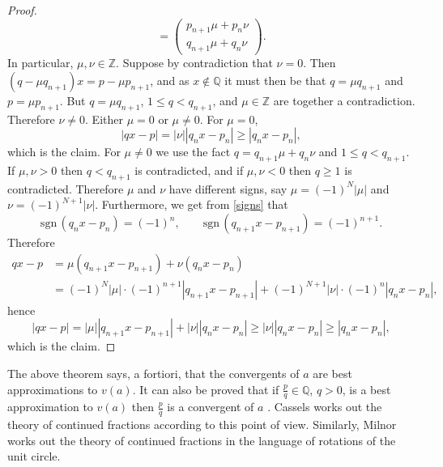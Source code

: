\documentclass{amsart}
\def\sgn{\ensuremath{\mathrm{sgn}}\,}
\begin{document}
\begin{proof}
\[=\begin{pmatrix}p_{n+1} \mu + p_n \nu\\ q_{n+1}\mu+q_n \nu\end{pmatrix}.
\]
In particular, $\mu,\nu \in \mathbb{Z}$.
Suppose by contradiction that $\nu=0$. Then $(q-\mu q_{n+1})x = p-\mu p_{n+1}$, and as $x \not \in \mathbb{Q}$ it must then be that 
$q=\mu q_{n+1}$ and $p=\mu p_{n+1}$. But $q=\mu q_{n+1}$, $1 \leq q < q_{n+1}$, and $\mu \in \mathbb{Z}$ are together a contradiction. Therefore
$\nu \neq 0$. 
Either $\mu=0$ or $\mu \neq 0$. For $\mu =0$,
\[
|qx-p| = |\nu| |q_nx-p_n| \geq |q_nx-p_n|,
\]
which is the claim. For $\mu \neq 0$ we use the fact
$q = q_{n+1} \mu + q_n \nu$ and $1 \leq q < q_{n+1}$. If $\mu,\nu>0$ then $q<q_{n+1}$ is contradicted,
and if $\mu,\nu<0$ then $q \geq 1$ is contradicted. Therefore $\mu$ and $\nu$ have different signs, say $\mu=(-1)^N |\mu|$ and 
$\nu=(-1)^{N+1} |\nu|$.
Furthermore, we get from \eqref{signs} that
\[
\sgn (q_n x - p_n) = (-1)^n,
\qquad \sgn (q_{n+1} x - p_{n+1}) = (-1)^{n+1}.
\]
Therefore
\begin{align*}
qx-p&=\mu (q_{n+1} x - p_{n+1}) + \nu(q_n x - p_n)\\
&=(-1)^N |\mu| \cdot (-1)^{n+1} |q_{n+1}x-p_{n+1}|
+ (-1)^{N+1} |\nu| \cdot (-1)^n |q_nx-p_n|,
\end{align*}
hence
\[
|qx-p| =  |\mu| |q_{n+1}x-p_{n+1}| +  |\nu| |q_nx-p_n| \geq
  |\nu| |q_nx-p_n| \geq |q_nx-p_n|,
\]
which is the claim.
\end{proof}

The above theorem says, a fortiori, that the convergents of $a$ are best approximations to $v(a)$. It can also be proved
that if $\frac{p}{q} \in \mathbb{Q}$, $q>0$, is a best approximation to $v(a)$ then $\frac{p}{q}$ is a convergent of $a$ \cite[p.~9, Theorem 6]{MR0209227}.
Cassels \cite[p.~2, Chapter I]{cassels} works out the theory of continued 
fractions according to this point of view. Similarly, Milnor \cite[p.~234, Appendix C]{milnor} works out the theory of continued fractions in the language of rotations of the unit circle. 
\end{document}
